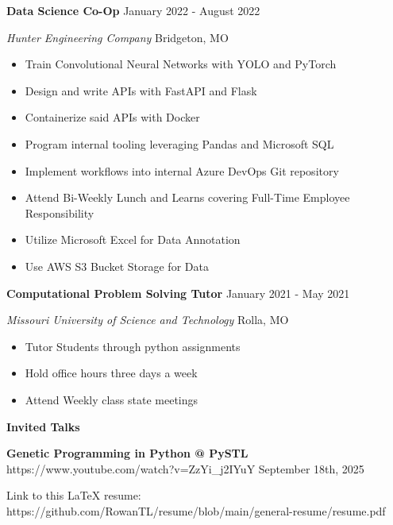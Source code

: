 \documentclass[11pt]{article}
\begin{document}

\textbf{Data Science Co-Op} \hfill January 2022 - August 2022

\textsl{Hunter Engineering Company} \hfill Bridgeton, MO
\begin{itemize}[noitemsep]
    \item Train Convolutional Neural Networks with YOLO and PyTorch
    \item Design and write APIs with FastAPI and Flask
    \item Containerize said APIs with Docker
    \item Program internal tooling leveraging Pandas and Microsoft SQL
    \item Implement workflows into internal Azure DevOps Git repository
    \item Attend Bi-Weekly Lunch and Learns covering Full-Time Employee Responsibility
    \item Utilize Microsoft Excel for Data Annotation
    \item Use AWS S3 Bucket Storage for Data
\end{itemize}

\textbf{Computational Problem Solving Tutor} \hfill January 2021 - May 2021

\textsl{Missouri University of Science and Technology} \hfill Rolla, MO
\begin{itemize}[noitemsep]
    \item Tutor Students through python assignments
    \item Hold office hours three days a week
    \item Attend Weekly class state meetings
\end{itemize}


\begin{center}
    \textbf{Invited Talks}
\end{center}

\textbf{Genetic Programming in Python @ PySTL} \tiny{https://www.youtube.com/watch?v=ZzYi\_j2IYuY} \hfill \normalsize{September 18th, 2025}

\begin{center}
    \tiny{Link to this LaTeX resume: https://github.com/RowanTL/resume/blob/main/general-resume/resume.pdf}
\end{center}
\end{document}

